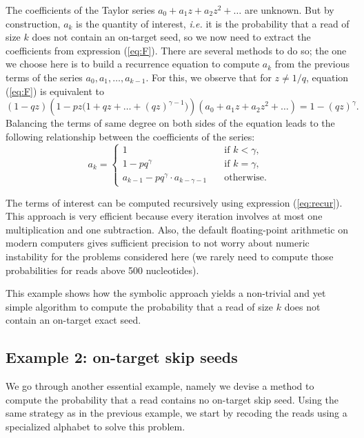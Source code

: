 \documentclass{article}
\begin{document}
The coefficients of the Taylor series $a_0 + a_1z + a_2z^2 + \ldots$ are
unknown. But by construction, $a_k$ is the quantity of interest,
\textit{i.e.} it is the probability that a read of size $k$ does not
contain an on-target seed, so we now need to extract the coefficients
from expression (\ref{eq:F}). There are several methods to do so; the one
we choose here is to build a recurrence equation to compute $a_k$ from the
previous terms of the series $a_0, a_1, \ldots, a_{k-1}$. For this, we
observe that for $z \neq 1/q$, equation (\ref{eq:F}) is equivalent to
\begin{equation*}
(1-qz) \left(1-pz \big(1+qz+\ldots+(qz)^{\gamma-1} \big)\right)
(a_0 + a_1z +a_2z^2 + \ldots) = 1-(qz)^\gamma.
\end{equation*}
Balancing the terms of same degree on both sides of the equation leads
to the following relationship between the coefficients of the series:
\begin{equation}
\label{eq:recur}
a_k = 
\begin{cases}
1            &\quad\text{if } k < \gamma, \\
1 -pq^\gamma &\quad\text{if } k = \gamma, \\
a_{k-1} -pq^\gamma \cdot a_{k-\gamma-1} &\quad\text{otherwise.}
\end{cases}
\end{equation}

The terms of interest can be computed recursively using expression
(\ref{eq:recur}). This approach is very efficient because every iteration
involves at most one multiplication and one subtraction. Also, the default
floating-point arithmetic on modern computers gives sufficient precision
to not worry about numeric instability for the problems considered here
(we rarely need to compute those probabilities for reads above 500
nucleotides).

This example shows how the symbolic approach yields a non-trivial and yet
simple algorithm to compute the probability that a read of size $k$ does
not contain an on-target exact seed.


\subsection{Example 2: on-target skip seeds}
\label{sec:example_skip}

We go through another essential example, namely we devise a method to
compute the probability that a read contains no on-target skip seed. Using
the same strategy as in the previous example, we start by recoding the
reads using a specialized alphabet to solve this problem.
\end{document}
